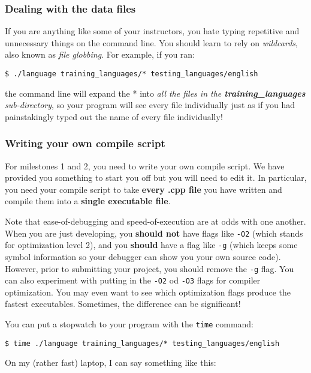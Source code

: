 \documentclass[]{article}
\begin{document}
\subsubsection{Dealing with the data
files}\label{dealing-with-the-data-files}

If you are anything like some of your instructors, you hate typing
repetitive and unnecessary things on the command line. You should learn
to rely on \emph{wildcards}, also known as \emph{file globbing}. For
example, if you ran:

\texttt{\$ ./language training_languages/* testing_languages/english}

the command line will expand the * into \emph{all the files in the
\textbf{training\_languages} sub-directory}, so your program will see
every file individually just as if you had painstakingly typed out the
name of every file individually!

\subsubsection{Writing your own compile
script}\label{writing-your-own-compile-script}

For milestones 1 and 2, you need to write your own compile script. We
have provided you something to start you off but you will need to edit
it. In particular, you need your compile script to take \textbf{every
.cpp file} you have written and compile them into a \textbf{single
executable file}.

Note that ease-of-debugging and speed-of-execution are at odds with one
another. When you are just developing, you \textbf{should not} have
flags like \texttt{-O2} (which stands for optimization level 2), and you
\textbf{should} have a flag like \texttt{-g} (which keeps some symbol
information so your debugger can show you your own source code).
However, prior to submitting your project, you should remove the
\texttt{-g} flag. You can also experiment with putting in the
\texttt{-O2} od \texttt{-O3} flags for compiler optimization. You may
even want to see which optimization flags produce the fastest
executables. Sometimes, the difference can be significant!

You can put a stopwatch to your program with the \texttt{time} command:

\texttt{\$ time ./language training_languages/* testing_languages/english}

On my (rather fast) laptop, I can say something like this:
\end{document}
